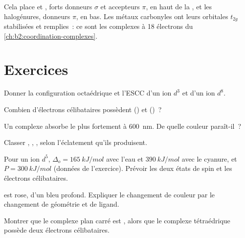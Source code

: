 Cela place  et , forts donneurs $\sigma$ et accepteurs $\pi$, en haut de la
, et les halogénures, donneurs $\pi$, en bas. Les métaux carbonyles ont
leurs orbitales $t_{2g}$ stabilisées et remplies~: ce sont les complexes à 18 électrons du
\cref{ch:b2:coordination-complexes}.

\section{Exercices}

\begin{exercise}[$\star$]\label{exo:b2:ligand-field:1}
Donner la configuration octaédrique et l'ESCC d'un ion $d^3$ et d'un ion $d^8$.
\end{exercise}

\begin{exercise}[$\star$]\label{exo:b2:ligand-field:2}
Combien d'électrons célibataires possèdent  () et  ()~?
\end{exercise}

\begin{exercise}[$\star$]\label{exo:b2:ligand-field:3}
Un complexe absorbe le plus fortement à \qty{600}{nm}. De quelle couleur paraît-il~?
\end{exercise}

\begin{exercise}[$\star$]\label{exo:b2:ligand-field:4}
Classer , , ,  selon l'éclatement qu'ils produisent.
\end{exercise}

\begin{exercise}[$\star\star$]\label{exo:b2:ligand-field:5}
Pour un ion $d^5$, $\Delta_o = \qty{165}{kJ/mol}$ avec l'eau et $\qty{390}{kJ/mol}$ avec le cyanure,
et $P = \qty{300}{kJ/mol}$ (données de l'exercice). Prévoir les deux états de spin et les électrons
célibataires.
\end{exercise}

\begin{exercise}[$\star\star$]\label{exo:b2:ligand-field:6}
 est rose,  d'un bleu profond. Expliquer le changement de couleur par le
changement de géométrie et de ligand.
\end{exercise}

\begin{exercise}[$\star\star$]\label{exo:b2:ligand-field:7}
Montrer que le complexe plan carré  est , alors que le complexe tétraédrique
 possède deux électrons célibataires.
\end{exercise}

